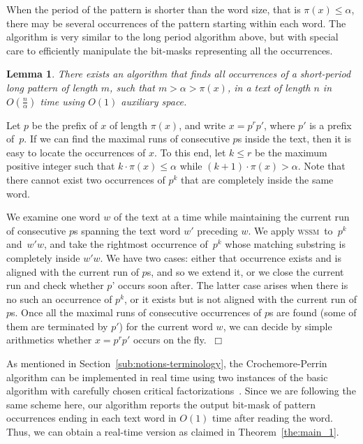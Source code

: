 \documentclass[12pt]{article}
\newtheorem{lemma}[theorem]{Lemma}
\newenvironment{proof}{\noindent{\bf Proof.\/}}{$~\Box$ \newline}
\newcommand{\C}{{\alpha}}
\newcommand{\wssm}{\textsc{wssm}}
\begin{document}
When the period of the pattern is shorter than the word size, that is $\pi(x)\leq \C$,
there may be several occurrences of the pattern starting within each word.
The algorithm is very similar to the long period algorithm above,
but with special care to efficiently 
manipulate the bit-masks representing all the occurrences.

\begin{lemma}
\label{lemma:longer2}
There exists an algorithm that finds all occurrences of a short-period
long pattern of length $m$,
such that  $m>\C> \pi(x)$, 
in a text of length $n$ in $O\!\left(\frac{n}{\C}\right)$ time 
using $O(1)$ auxiliary space.
\end{lemma}

\begin{proof}
Let $p$ be the prefix of $x$ of
length $\pi(x)$, and write $x=p^r p'$, where $p'$ is a prefix
of~$p$. If we can find the maximal runs of consecutive $p$s inside
the text, then it is easy to locate the occurrences of $x$. To this
end, let $k \leq r$ be the maximum positive integer such that $k \cdot
\pi(x) \leq \C$ while $(k+1) \cdot \pi(x) > \C$. Note that there cannot exist two occurrences of $p^k$ that are completely inside the same word.

We examine one word $w$ of the text at a time while maintaining the
current run of consecutive $p$s spanning the text word $w'$ preceding
$w$. We apply \wssm\ to~$p^k$ and~$w'w$, and take the rightmost
occurrence of~$p^k$ whose matching substring is completely inside
$w'w$. We have two cases: either that occurrence exists and is aligned
with the current run of $p$s, and so we extend it, or we close the
current run and check whether $p$' occurs soon after.  The latter case
arises when there is no such an occurrence of $p^k$, or it exists but
is not aligned with the current run of $p$s.
%
Once all the maximal runs of consecutive occurrences of $p$s are found
(some of them are terminated by $p'$) for the current word $w$, we can 
decide by simple arithmetics whether $x = p^r p'$ occurs on the fly. 
\end{proof}


\smallskip{}
\label{real}
As mentioned in Section~\ref{sub:notions-terminology},
the Crochemore-Perrin algorithm can be implemented in
real time using two instances of the basic algorithm with carefully
chosen critical factorizations~\cite{bgm:11}. Since we are following the same scheme
here, our algorithm reports the output bit-mask of pattern occurrences
ending in each text word in $O(1)$ time after reading the word.
Thus, we can obtain a real-time version as claimed in Theorem~\ref{the:main_1}.
\end{document}
